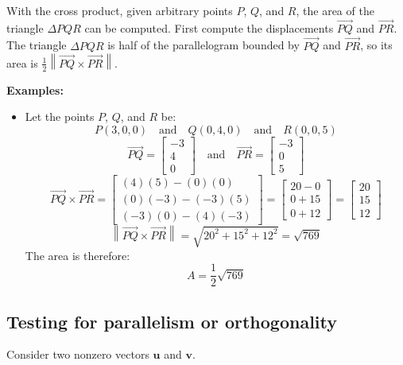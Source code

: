 \documentclass{article}
\begin{document}
\vspace{5mm}

With the cross product, given arbitrary points \(P\), \(Q\), and \(R\), the area of the triangle \(\Delta PQR\) can be computed. First compute the displacements \(\overrightarrow{PQ}\) and \(\overrightarrow{PR}\). The triangle \(\Delta PQR\) is half of the parallelogram bounded by \(\overrightarrow{PQ}\) and \(\overrightarrow{PR}\), so its area is \(\frac{1}{2}\left\|\overrightarrow{PQ} \times \overrightarrow{PR}\right\|\). 

\textbf{Examples:}
\begin{itemize}
\item Let the points \(P\), \(Q\), and \(R\) be:
\[P(3, 0, 0) \quad\text{and}\quad Q(0, 4, 0) \quad\text{and}\quad R(0, 0, 5)\]
\[\overrightarrow{PQ} = \begin{bmatrix} -3 \\ 4 \\ 0 \end{bmatrix} \quad\text{and}\quad \overrightarrow{PR} = \begin{bmatrix} -3 \\ 0 \\ 5 \end{bmatrix}\]
\[\overrightarrow{PQ} \times \overrightarrow{PR} = \begin{bmatrix} (4)(5) - (0)(0) \\ (0)(-3) - (-3)(5) \\ (-3)(0) - (4)(-3) \end{bmatrix} = \begin{bmatrix} 20 - 0 \\ 0 + 15 \\ 0 + 12 \end{bmatrix} = \begin{bmatrix} 20 \\ 15 \\ 12 \end{bmatrix}\]
\[\left\|\overrightarrow{PQ} \times \overrightarrow{PR}\right\| = \sqrt{20^2 + 15^2 + 12^2} = \sqrt{769}\]
The area is therefore:
\[A = \frac{1}{2}\sqrt{769}\]
\end{itemize}




\subsection*{Testing for parallelism or orthogonality}

Consider two nonzero vectors \(\mathbf{u}\) and \(\mathbf{v}\). 
\end{document}
